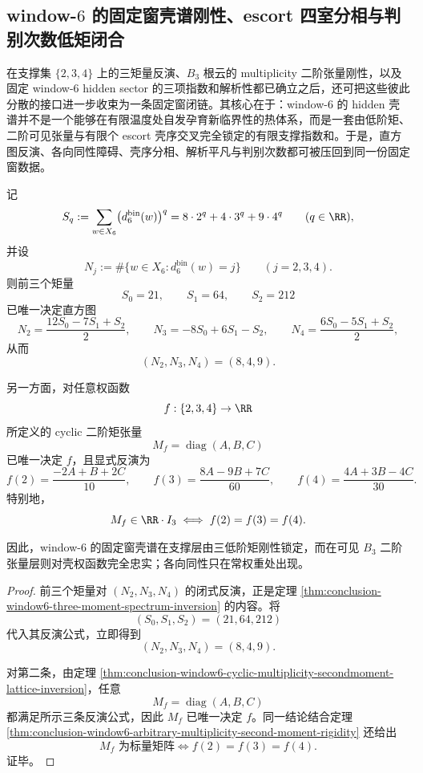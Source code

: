 \subsection{window-\texorpdfstring{$6$}{6} 的固定窗壳谱刚性、escort 四室分相与判别次数低矩闭合}\label{subsec:conclusion-window6-fixedwindow-shell-escort-discriminant-rigidity}

在支撑集 \(\{2,3,4\}\) 上的三矩量反演、\(B_3\) 根云的 multiplicity 二阶张量刚性，以及固定 window-\(6\) hidden sector 的三项指数和解析性都已确立之后，还可把这些彼此分散的接口进一步收束为一条固定窗闭链。其核心在于：window-\(6\) 的 hidden 壳谱并不是一个能够在有限温度处自发孕育新临界性的热体系，而是一套由低阶矩、二阶可见张量与有限个 escort 壳序交叉完全锁定的有限支撑指数和。于是，直方图反演、各向同性障碍、壳序分相、解析平凡与判别次数都可被压回到同一份固定窗数据。

\begin{theorem}\label{thm:conclusion-window6-fixedwindow-shell-dual-completeness}
记
\[
S_q:=\sum_{w\in X_6}\bigl(d_6^{\mathrm{bin}}(w)\bigr)^q
=8\cdot 2^q+4\cdot 3^q+9\cdot 4^q
\qquad (q\in\RR),
\]
并设
\[
N_j:=\#\{w\in X_6:d_6^{\mathrm{bin}}(w)=j\}
\qquad (j=2,3,4).
\]
则前三个矩量
\[
S_0=21,\qquad S_1=64,\qquad S_2=212
\]
已唯一决定直方图
\[
N_2=\frac{12S_0-7S_1+S_2}{2},\qquad
N_3=-8S_0+6S_1-S_2,\qquad
N_4=\frac{6S_0-5S_1+S_2}{2},
\]
从而
\[
(N_2,N_3,N_4)=(8,4,9).
\]

另一方面，对任意权函数
\[
f:\{2,3,4\}\to\RR
\]
所定义的 cyclic 二阶矩张量
\[
M_f=\operatorname{diag}(A,B,C)
\]
已唯一决定 \(f\)，且显式反演为
\[
f(2)=\frac{-2A+B+2C}{10},
\qquad
f(3)=\frac{8A-9B+7C}{60},
\qquad
f(4)=\frac{4A+3B-4C}{30}.
\]
特别地，
\[
M_f\in \RR\cdot I_3
\iff
f(2)=f(3)=f(4).
\]

因此，window-\(6\) 的固定窗壳谱在支撑层由三低阶矩刚性锁定，而在可见 \(B_3\) 二阶张量层则对壳权函数完全忠实；各向同性只在常权重处出现。
\end{theorem}

\begin{proof}
前三个矩量对 \((N_2,N_3,N_4)\) 的闭式反演，正是定理 \ref{thm:conclusion-window6-three-moment-spectrum-inversion} 的内容。将
\[
(S_0,S_1,S_2)=(21,64,212)
\]
代入其反演公式，立即得到
\[
(N_2,N_3,N_4)=(8,4,9).
\]

对第二条，由定理 \ref{thm:conclusion-window6-cyclic-multiplicity-secondmoment-lattice-inversion}，任意
\[
M_f=\operatorname{diag}(A,B,C)
\]
都满足所示三条反演公式，因此 \(M_f\) 已唯一决定 \(f\)。同一结论结合定理 \ref{thm:conclusion-window6-arbitrary-multiplicity-second-moment-rigidity} 还给出
\[
M_f \text{ 为标量矩阵}
\iff
f(2)=f(3)=f(4).
\]
证毕。
\end{proof}

